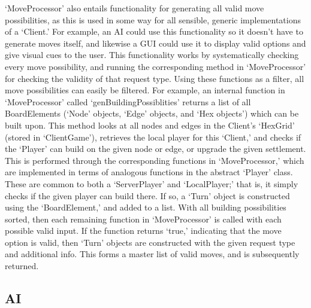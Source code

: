 \documentclass[a4paper,doc,draftfirst]{apa6}
\begin{document}
‘MoveProcessor’ also entails functionality for generating all valid move possibilities, as this is used in some way for all sensible, generic implementations of a ‘Client.’ For example, an AI could use this functionality so it doesn’t have to generate moves itself, and likewise a GUI could use it to display valid options and give visual cues to the user. This functionality works by systematically checking every move possibility, and running the corresponding method in ‘MoveProcessor’ for checking the  validity of that request type. Using these functions as a filter, all move possibilities can easily be filtered. For example, an internal function in ‘MoveProcessor’ called ‘genBuildingPossiblities’ returns a list of all BoardElements (‘Node’ objects, ‘Edge’ objects, and ‘Hex objects’) which can be built upon. This method looks at all nodes and edges in the Client’s ‘HexGrid’ (stored in ‘ClientGame’), retrieves the local player for this ‘Client,’ and checks if the ‘Player’ can build on the given node or edge, or upgrade the given settlement. This is performed through the corresponding functions in ‘MoveProcessor,’ which are implemented in terms of analogous functions in the abstract ‘Player’ class. These are common to both a ‘ServerPlayer’ and ‘LocalPlayer;’ that is, it simply checks if the given player can build there. If so, a ‘Turn’ object is constructed using the ‘BoardElement,’ and added to a list. With all building possibilities sorted, then each remaining function in ‘MoveProcessor’ is called with each possible valid input. If the function returns ‘true,’ indicating that the move option is valid, then ‘Turn’ objects are constructed with the given request type and additional info. This forms a master list of valid moves, and is subsequently returned.

\subsection{AI}
\end{document}
